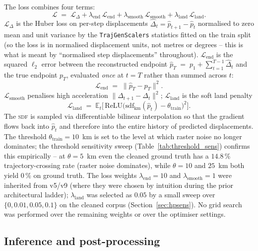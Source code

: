 \documentclass[oneside, a4paper, onecolumn, 11pt]{article}
\newcommand{\sdf}{\textsc{sdf}}
\begin{document}
The loss combines four terms:
\begin{equation}\label{eq:loss}
  \mathcal{L} \;=\; \mathcal{L}_{\Delta}
    + \lambda_{\mathrm{end}}\,\mathcal{L}_{\mathrm{end}}
    + \lambda_{\mathrm{smooth}}\,\mathcal{L}_{\mathrm{smooth}}
    + \lambda_{\mathrm{land}}\,\mathcal{L}_{\mathrm{land}}.
\end{equation}
$\mathcal{L}_{\Delta}$ is the Huber loss on per-step displacements
$\hat\Delta_t = \hat p_{t+1} - \hat p_t$ normalised to zero mean and
unit variance by the \texttt{TrajGenScalers} statistics fitted on the
train split (so the loss is in normalised displacement units, not
metres or degrees -- this is what is meant by ``normalised step
displacements'' throughout).  $\mathcal{L}_{\mathrm{end}}$ is the
squared $\ell_2$ error between the reconstructed endpoint
$\hat p_T \;=\; p_1 + \sum_{t=1}^{T-1} \hat\Delta_t$ and the true
endpoint $p_T$, evaluated \emph{once} at $t = T$ rather than summed
across $t$:
\[
  \mathcal{L}_{\mathrm{end}}
   \;=\; \bigl\| \hat p_T - p_T \bigr\|^2.
\]
$\mathcal{L}_{\mathrm{smooth}}$ penalises high acceleration
$\|\Delta_{t+1} - \Delta_t\|^2$;
$\mathcal{L}_{\mathrm{land}}$ is the soft land penalty
\[
  \mathcal{L}_{\mathrm{land}}
   \;=\; \mathbb{E}_t\bigl[\,
     \mathrm{ReLU}\bigl(\mathrm{sdf}_{\mathrm{km}}(\hat p_t)
                        - \theta_{\mathrm{train}}\bigr)^2 \bigr].
\]
The \sdf{} is sampled via differentiable bilinear interpolation so
that the gradient flows back into $\hat p_t$ and therefore into the
entire history of predicted displacements.  The threshold
$\theta_{\mathrm{train}} = 10$~km is set to the level at which raster
noise no longer dominates; the threshold sensitivity sweep
(Table~\ref{tab:threshold_sens}) confirms this empirically -- at
$\theta = 5$~km even the cleaned ground truth has a $14.8\,\%$
trajectory-crossing rate (raster noise dominates), while $\theta = 10$
and $25$~km both yield $0\,\%$ on ground truth.
The loss weights $\lambda_{\mathrm{end}} = 10$ and
$\lambda_{\mathrm{smooth}} = 1$ were inherited from v5/v9 (where they
were chosen by intuition during the prior architectural ladder);
$\lambda_{\mathrm{land}}$ was selected as $0.05$ by a small sweep over
$\{0, 0.01, 0.05, 0.1\}$ on the cleaned corpus
(Section~\ref{sec:hpsens}).  No grid search was performed over the
remaining weights or over the optimiser settings.

\subsection{Inference and post-processing}\label{sec:inference}
\end{document}

